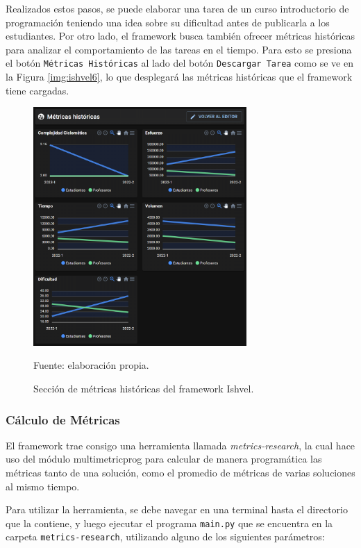 \documentclass[letterpaper,12pt]{article}
\begin{document}
Realizados estos pasos, se puede elaborar una tarea de un curso introductorio de programación teniendo una idea sobre su dificultad antes de publicarla a los estudiantes. Por otro lado, el framework busca también ofrecer métricas históricas para analizar el comportamiento de las tareas en el tiempo. Para esto se presiona el botón \texttt{Métricas Históricas} al lado del botón \texttt{Descargar Tarea} como se ve en la Figura \ref{img:ishvel6}, lo que desplegará las métricas históricas que el framework tiene cargadas.

\begin{figure}[H]
  \centering
  \includegraphics[width=0.725\textwidth]{figures/ishvel7.png}
  \caption{Sección de métricas históricas del framework Ishvel.} Fuente: elaboración propia.
  \label{img:ishvel71}
\end{figure}

\subsubsection{Cálculo de Métricas} \label{sssec:metricsCalc}

El framework trae consigo una herramienta llamada \textit{metrics-research}, la cual hace uso del módulo multimetricprog \cite{privkweihmann_multimetricprog} para calcular de manera programática las métricas tanto de una solución, como el promedio de métricas de varias soluciones al mismo tiempo.

Para utilizar la herramienta, se debe navegar en una terminal hasta el directorio que la contiene, y luego ejecutar el programa \texttt{main.py} que se encuentra en la carpeta \texttt{metrics-research}, utilizando alguno de los siguientes parámetros:
\end{document}

